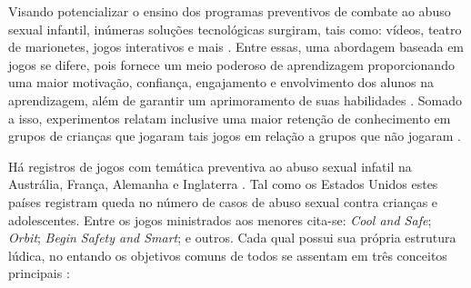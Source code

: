 
Visando potencializar o ensino dos programas preventivos de combate ao abuso sexual infantil, inúmeras soluções tecnológicas surgiram, tais como: vídeos, teatro de marionetes, jogos interativos e mais \cite{muller2014child, davis2000child}. Entre essas, uma abordagem baseada em jogos se difere, pois fornece um meio poderoso de aprendizagem proporcionando uma maior motivação, confiança, engajamento e envolvimento dos alunos na aprendizagem, além de garantir um aprimoramento de suas habilidades \cite{dip2016advancing}. Somado a isso, experimentos relatam inclusive uma maior retenção de conhecimento em grupos de crianças que jogaram tais jogos em relação a grupos que não jogaram \cite{muller2014child, fingerleabschlussbericht}. 

Há registros de jogos com temática preventiva ao abuso sexual infatil na Austrália, França, Alemanha e Inglaterra \cite{millman2019uk}. Tal como os Estados Unidos estes países registram queda no número de casos de abuso sexual contra crianças e adolescentes. Entre os jogos ministrados aos menores cita-se: \textit{Cool and Safe}; \textit{Orbit}; \textit{Begin Safety and Smart}; e outros. Cada qual possui sua própria estrutura lúdica, no entando os objetivos comuns de todos se assentam em três conceitos principais \cite{maria2010papel}:  


